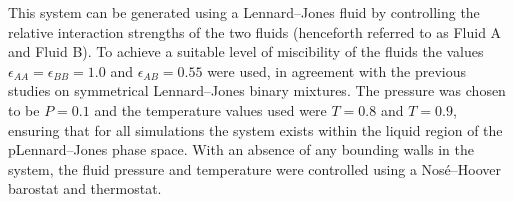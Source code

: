 This system can be generated using a Lennard--Jones fluid by controlling the relative interaction strengths of the two fluids (henceforth referred to as Fluid A and Fluid B).
To achieve a suitable level of miscibility of the fluids the values $\epsilon_{AA} = \epsilon_{BB} = 1.0$ and $\epsilon_{AB}=0.55$ were used, in agreement with the previous studies on symmetrical Lennard--Jones binary mixtures.\cite{MorenzoRazo,Blas}
The pressure was chosen to be $P=0.1$ and the temperature values used were $T=0.8$ and $T=0.9$, ensuring that for all simulations the system exists within the liquid region of the pLennard--Jones phase space.\cite{Smit}
With an absence of any bounding walls in the system, the fluid pressure and temperature were controlled using a Nos\'{e}--Hoover barostat and thermostat.
